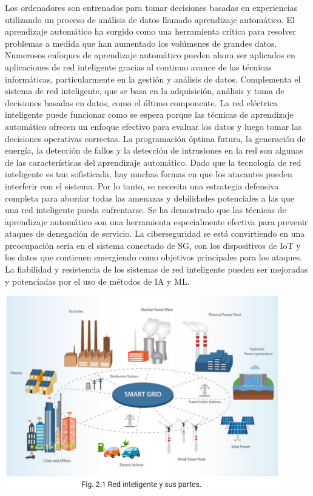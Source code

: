\documentclass[crop=false]{standalone}
\begin{document}
Los ordenadores son entrenados para tomar decisiones basadas en experiencias utilizando un proceso de análisis de datos llamado aprendizaje automático. El aprendizaje automático ha surgido como una herramienta crítica para resolver problemas a medida que han aumentado los volúmenes de grandes datos. Numerosos enfoques de aprendizaje automático pueden ahora ser aplicados en aplicaciones de red inteligente gracias al continuo avance de las técnicas informáticas, particularmente en la gestión y análisis de datos. Complementa el sistema de red inteligente, que se basa en la adquisición, análisis y toma de decisiones basadas en datos, como el último componente. La red eléctrica inteligente puede funcionar como se espera porque las técnicas de aprendizaje automático ofrecen un enfoque efectivo para evaluar los datos y luego tomar las decisiones operativas correctas. La programación óptima futura, la generación de energía, la detección de fallos y la detección de intrusiones en la red son algunas de las características del aprendizaje automático.
Dado que la tecnología de red inteligente es tan sofisticada, hay muchas formas en que los atacantes pueden interferir con el sistema. Por lo tanto, se necesita una estrategia defensiva completa para abordar todas las amenazas y debilidades potenciales a las que una red inteligente pueda enfrentarse. Se ha demostrado que las técnicas de aprendizaje automático son una herramienta especialmente efectiva para prevenir ataques de denegación de servicio. La ciberseguridad se está convirtiendo en una preocupación seria en el sistema conectado de SG, con los dispositivos de IoT y los datos que contienen emergiendo como objetivos principales para los ataques. La fiabilidad y resistencia de los sistemas de red inteligente pueden ser mejoradas y potenciadas por el uso de métodos de IA y ML.

\begin{center}
\includegraphics[width=0.9\textwidth]{images/foto_texto_traducido.PNG}

\end{center}
\end{document}
